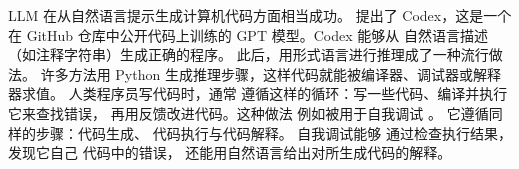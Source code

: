 LLM 在从自然语言提示生成计算机代码方面相当成功。
\citet{chen2021evaluating} 提出了 Codex，这是一个在
GitHub 仓库中公开代码上训练的 GPT 模型。Codex 能够从
自然语言描述（如注释字符串）生成正确的程序。
%
此后，用形式语言进行推理成了一种流行做法。%
许多方法用 Python 生成推理步骤，这样代码就能被编译器、调试器或解释器求值。
人类程序员写代码时，通常
遵循这样的循环：写一些代码、编译并执行它来查找错误，
再用反馈改进代码。这种做法
例如被用于自我调试
\citep{chen2023teaching}。%
它遵循同样的步骤：代码生成、
代码执行与代码解释。
%
自我调试能够%
通过检查执行结果，发现它自己
代码中的错误，%
还能用自然语言给出对所生成代码的解释。%



